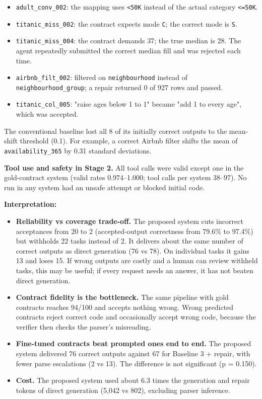 \documentclass[11pt]{article}
\providecommand{\tightlist}{\setlength{\itemsep}{0pt}\setlength{\parskip}{0pt}}
\begin{document}
\begin{itemize}
\tightlist
\item
  \texttt{adult\_\allowbreak{}conv\_\allowbreak{}002}: the mapping uses
  \texttt{<50K} instead of the actual category \texttt{<=50K}.
\item
  \texttt{titanic\_\allowbreak{}miss\_\allowbreak{}002}: the contract
  expects mode \texttt{C}; the correct mode is \texttt{S}.
\item
  \texttt{titanic\_\allowbreak{}miss\_\allowbreak{}004}: the contract
  demands 37; the true median is 28. The agent repeatedly submitted the
  correct median fill and was rejected each time.
\item
  \texttt{airbnb\_\allowbreak{}filt\_\allowbreak{}002}: filtered on
  \texttt{neighbourhood} instead of
  \texttt{neighbourhood\_\allowbreak{}group}; a repair returned 0 of 927
  rows and passed.
\item
  \texttt{titanic\_\allowbreak{}col\_\allowbreak{}005}: "raise ages
  below 1 to 1" became "add 1 to every age", which was accepted.
\end{itemize}

The conventional baseline lost all 8 of its initially correct outputs to
the mean-shift threshold (0.1). For example, a correct Airbnb filter
shifts the mean of \texttt{availability\_\allowbreak{}365} by 0.31
standard deviations.

\textbf{Tool use and safety in Stage 2.} All tool calls were valid
except one in the gold-contract system (valid rates 0.974--1.000; tool
calls per system 38--97). No run in any system had an unsafe attempt or
blocked initial code.

\textbf{Interpretation:}

\begin{itemize}
\tightlist
\item
  \textbf{Reliability vs coverage trade-off.} The proposed system cuts
  incorrect acceptances from 20 to 2 (accepted-output correctness from
  79.6\% to 97.4\%) but withholds 22 tasks instead of 2. It delivers
  about the same number of correct outputs as direct generation (76 vs
  78). On individual tasks it gains 13 and loses 15. If wrong outputs
  are costly and a human can review withheld tasks, this may be useful;
  if every request needs an answer, it has not beaten direct generation.
\item
  \textbf{Contract fidelity is the bottleneck.} The same pipeline with
  gold contracts reaches 94/100 and accepts nothing wrong. Wrong
  predicted contracts reject correct code and occasionally accept wrong
  code, because the verifier then checks the parser's misreading.
\item
  \textbf{Fine-tuned contracts beat prompted ones end to end.} The
  proposed system delivered 76 correct outputs against 67 for Baseline 3
  + repair, with fewer parse escalations (2 vs 13). The difference is
  not significant (p = 0.150).
\item
  \textbf{Cost.} The proposed system used about 6.3 times the generation
  and repair tokens of direct generation (5,042 vs 802), excluding
  parser inference.
\end{itemize}
\end{document}

